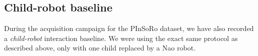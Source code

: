 \documentclass{article}
\begin{document}
%
%
%
%

\subsection{Child-robot baseline}

During the acquisition campaign for the PInSoRo dataset, we have also recorded a
\emph{child-robot} interaction baseline. We were using the exact same protocol
as described above, only with one child replaced by a Nao robot.
\end{document}

